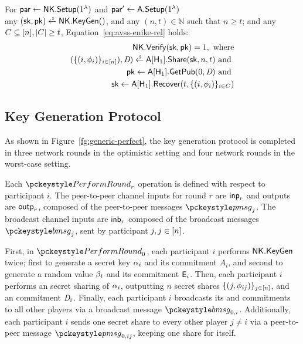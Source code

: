\begin{assumption} \label{ass:avss-enike}
  For $\mathsf{par} \gets \mathsf{NK}.\mathsf{Setup}(1^\lambda)$ and $\mathsf{par}' \gets \mathsf{A}.\mathsf{Setup}(1^\lambda)$ \\
  any $(\sk, \pk) \rgets \enike.\keygen()$,
  and any $(n, t) \in \mathbb{N}$ such that $n \geq t$;
  and any $C \subseteq [n], \lvert C \rvert \geq t$,
  Equation~\ref{eq:avss-enike-rel} holds:
  \begin{align} \label{eq:avss-enike-rel}
    \begin{split}
      \enike.\verify(\sk, \pk) = 1, \text{ where} \\
      (\{ (i, \share_i) \}_{i \in \set{n}}), \vsscommit) \rgets \avss[\Hash_1].\issueshares(\sk, n, t) \text{ and } \\
      \pk \gets \avss[\Hash_1].\derivepshare(0, \vsscommit) \text{ and } \\
      \sk \gets \avss[\Hash_1].\recover(t, \{(i, \share_i) \}_{i \in C})
    \end{split}
  \end{align}
\end{assumption}


\subsection{Key Generation Protocol}
As shown in Figure~\ref{fg:generic-perfect},
the key generation protocol is completed in three network rounds in the optimistic setting and four network
rounds in the worst-case setting.

Each $\dkgkeygen_r$ operation is defined with respect to participant $i$.
The peer-to-peer channel inputs for round $r$ are $\mathsf{inp}_r$ and outputs are $\mathsf{outp}_r$,
composed of the peer-to-peer messages $\pmsg_j$.
The broadcast channel inputs are $\mathsf{inb}_r$
composed of the broadcast messages $\bmsg_j$,
sent by participant $j, j \in [n]$.

First, in $\dkgkeygen_0$, each participant $i$ performs $\mathsf{NK}.\mathsf{KeyGen}$ twice;
first to generate a secret key $\alpha_i$ and its commitment $A_i$,
and second to generate a random value $\beta_i$ and its commitment $\mathsf{E}_i$.
%
Then, each participant $i$ performs an \AVSS secret sharing of $\alpha_i$,
outputting $n$ secret shares $\{ (j, \phi_{ij}) \}_{j \in [n]}$,
and an \AVSS commitment $\textit{D}_i$.
Finally, each participant $i$ broadcasts its \ENIKE and \AVSS commitments to all other players via a broadcast message $\bmsg_{0,i}$.
Additionally, each participant $i$ sends one secret share to every other player $j \neq i$ via a peer-to-peer message $\pmsg_{0,ij}$,
keeping one share for itself.

